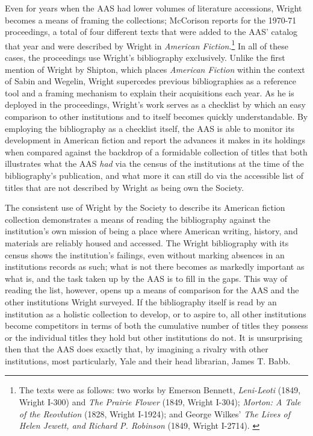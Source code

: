 Even for years when the AAS had lower volumes of literature accessions, Wright becomes a means of framing the collections; McCorison reports for the 1970-71 proceedings, a total of four different texts that were added to the AAS' catalog that year and were described by Wright in \textit{American Fiction}.\footnote{The texts were as follows: two works by Emerson Bennett, \textit{Leni-Leoti} (1849, Wright I-300) and \textit{The Prairie Flower} (1849, Wright I-304); \textit{Morton: A Tale of the Reovlution} (1828, Wright I-1924); and George Wilkes' \textit{The Lives of Helen Jewett, and Richard P. Robinson} (1849, Wright I-2714). \autocite[223]{marcus_a._mccorison_report_1971}} In all of these cases, the proceedings use Wright's bibliography exclusively. Unlike the first mention of Wright by Shipton, which places \textit{American Fiction} within the context of Sabin and Wegelin, Wright supercedes previous bibliographies as a reference tool and a framing mechanism to explain their acquisitions each year. As he is deployed in the proceedings, Wright's work serves as a checklist by which an easy comparison to other institutions and to itself becomes quickly understandable. By employing the bibliography as a checklist itself, the AAS is able to monitor its development in American fiction and report the advances it makes in its holdings when compared against the backdrop of a formidable collection of titles that both illustrates what the AAS \textit{had} via the census of the institutions at the time of the bibliography's publication, and what more it can still do via the accessible list of titles that are not described by Wright as being own the Society.

The consistent use of Wright by the Society to describe its American fiction collection demonstrates a means of reading the bibliography against the institution's own mission of being a place where American writing, history, and materials are reliably housed and accessed. The Wright bibliography with its census shows the institution's failings, even without marking absences in an institutions records as such; what is not there becomes as markedly important as what is, and the task taken up by the AAS is to fill in the gaps. This way of reading the list, however, opens up a means of comparison for the AAS and the other institutions Wright surveyed. If the bibliography itself is read by an institution as a holistic collection to develop, or to aspire to, all other institutions become competitors in terms of both the cumulative number of titles they possess or the individual titles they hold but other institutions do not. It is unsurprising then that the AAS does exactly that, by imagining a rivalry with other institutions, most particularly, Yale and their head librarian, James T. Babb. 


